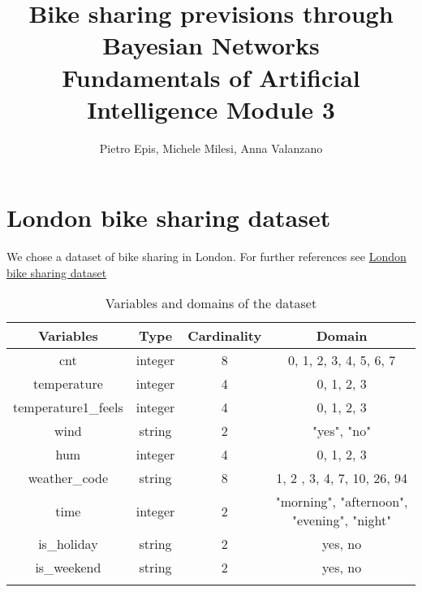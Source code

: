 \documentclass[letterpaper,11pt]{article}
\begin{document}
\title{%
  Bike sharing previsions through Bayesian Networks \\
  \vspace{0.5cm}
  \large Fundamentals of Artificial Intelligence 
    Module 3}
\author{Pietro Epis, Michele Milesi, Anna Valanzano}
\maketitle

\begin{abstract}

\end{abstract}

\section{London bike sharing dataset}
We chose a dataset of bike sharing in London. For further references see \href{https://www.kaggle.com/datasets/hmavrodiev/london-bike-sharing-dataset}{London bike sharing dataset}

\begin{table}[h]
\begin{center}

\label{table2} 
\begin{tabular}{cccc} 
\hline
\multicolumn{1}{c}{Variables} & \multicolumn{1}{c}{Type} & \multicolumn{1}{c}{Cardinality}& \multicolumn{1}{c}{Domain }\\
\hline
cnt &   integer & 8 & 0, 1, 2, 3, 4, 5, 6, 7 \\
temperature &   integer & 4 & 0, 1, 2, 3\\
temperature1\_feels & integer & 4   & 0, 1, 2, 3\\
wind & string & 2 & "yes", "no"\\
hum & integer & 4 & 0, 1, 2, 3 \\
weather\_code & string & 8 & 1, 2 , 3, 4, 7, 10, 26, 94\\
time & integer & 2 & "morning", "afternoon", "evening", "night" \\
is\_holiday  & string &2 & yes, no\\
is\_weekend  & string &2 & yes, no\\\\


\hline
\end{tabular}
\caption{Variables and domains of the dataset}
\end{center}
\end{table}
\end{document}
